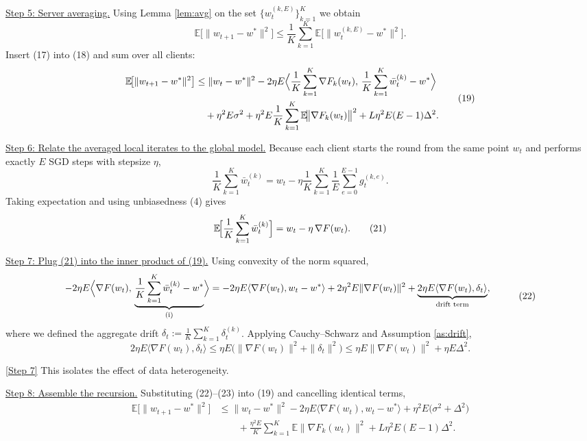 \documentclass[11pt]{article}
\begin{document}
\noindent\underline{Step 5: Server averaging.}
Using Lemma \ref{lem:avg} on the set
\(\{w_{t}^{(k,E)}\}_{k=1}^{K}\) we obtain
\[
\mathbb{E}\!\bigl[\|w_{t+1}-w^{*}\|^{2}\bigr]
 \le \frac1K\sum_{k=1}^{K}
     \mathbb{E}\!\bigl[\|w_{t}^{(k,E)}-w^{*}\|^{2}\bigr].
\tag{18}
\]
Insert (17) into (18) and sum over all clients:
\[
\begin{aligned}
\mathbb{E}\!\bigl[\|w_{t+1}-w^{*}\|^{2}\bigr]
 &\le \|w_t-w^{*}\|^{2}
    -2\eta E\Bigl\langle
        \frac1K\sum_{k=1}^{K}\nabla F_k(w_t),\,
        \frac1K\sum_{k=1}^{K}\bar w_{t}^{(k)}-w^{*}
      \Bigr\rangle \\
 &\quad +\eta^{2}E\sigma^{2}
        +\eta^{2}E\frac1K\sum_{k=1}^{K}
            \mathbb{E}\!\bigl\|\nabla F_k(w_t)\bigr\|^{2}
        +L\eta^{2}E(E-1)\Delta^{2}.
\end{aligned}
\tag{19}
\]

\noindent\underline{Step 6: Relate the averaged local iterates to the global model.}
Because each client starts the round from the same point \(w_t\) and
performs exactly \(E\) SGD steps with stepsize \(\eta\),
\[
\frac1K\sum_{k=1}^{K}\bar w_{t}^{(k)}
   = w_t - \eta\frac1K\sum_{k=1}^{K}\frac1E\sum_{e=0}^{E-1}
        g_{t}^{(k,e)} .
\tag{20}
\]
Taking expectation and using unbiasedness (4) gives
\[
\mathbb{E}\!\Bigl[\frac1K\sum_{k=1}^{K}\bar w_{t}^{(k)}\Bigr]
   = w_t - \eta\,\nabla F(w_t).
\tag{21}
\]

\noindent\underline{Step 7: Plug (21) into the inner product of (19).}
Using convexity of the norm squared,
\[
\begin{aligned}
-2\eta E\Bigl\langle\nabla F(w_t),\,
        \underbrace{\frac1K\sum_{k=1}^{K}\bar w_{t}^{(k)}-w^{*}}_{\text{(i)}}
      \Bigr\rangle
 &=-2\eta E\langle\nabla F(w_t), w_t-w^{*}\rangle
   +2\eta^{2}E\|\nabla F(w_t)\|^{2}
   +\underbrace{2\eta E\langle\nabla F(w_t),\delta_t\rangle}_{\text{drift term}},
\end{aligned}
\tag{22}
\]
where we defined the aggregate drift
\(\displaystyle \delta_t:=\frac1K\sum_{k=1}^{K}\delta_t^{(k)}\).
Applying Cauchy–Schwarz and Assumption \ref{as:drift},
\[
2\eta E\langle\nabla F(w_t),\delta_t\rangle
 \le \eta E\bigl(\|\nabla F(w_t)\|^{2}+\|\delta_t\|^{2}\bigr)
 \le \eta E\|\nabla F(w_t)\|^{2}+ \eta E\Delta^{2}.
\tag{23}
\]

\underline{[Step 7]} This isolates the effect of data heterogeneity.

\noindent\underline{Step 8: Assemble the recursion.}
Substituting (22)–(23) into (19) and cancelling identical terms,
\[
\begin{aligned}
\mathbb{E}\!\bigl[\|w_{t+1}-w^{*}\|^{2}\bigr]
 &\le \|w_t-w^{*}\|^{2}
    -2\eta E\langle\nabla F(w_t),w_t-w^{*}\rangle
    +\eta^{2}E\bigl(\sigma^{2}+\Delta^{2}\bigr) \\
 &\qquad +\frac{\eta^{2}E}{K}\sum_{k=1}^{K}
        \mathbb{E}\!\bigl\|\nabla F_k(w_t)\bigr\|^{2}
    +L\eta^{2}E(E-1)\Delta^{2}.
\end{aligned}
\tag{24}
\]
\end{document}
